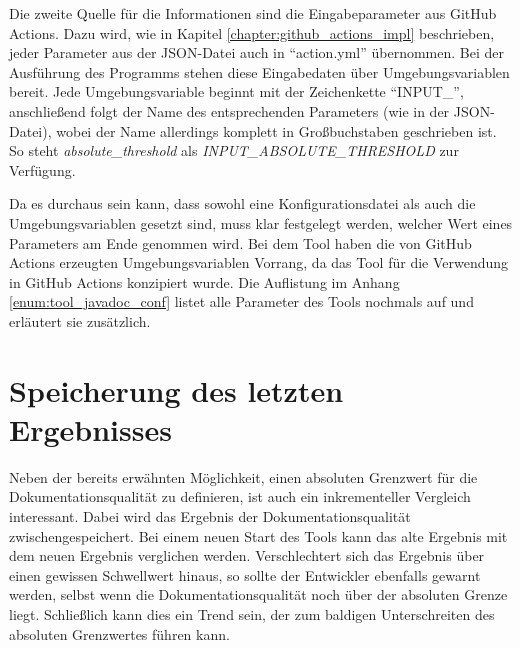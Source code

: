 \bigskip
Die zweite Quelle für die Informationen sind die Eingabeparameter aus GitHub Actions. Dazu wird, wie in Kapitel \ref{chapter:github_actions_impl} beschrieben, jeder Parameter aus der \ac{JSON}-Datei auch in \enquote{action.yml} übernommen. Bei der Ausführung des Programms stehen diese Eingabedaten über Umgebungsvariablen bereit. Jede Umgebungsvariable beginnt mit der Zeichenkette \enquote{INPUT\_}, anschließend folgt der Name des entsprechenden Parameters (wie in der \ac{JSON}-Datei), wobei der Name allerdings komplett in Großbuchstaben geschrieben ist. So steht  \textit{absolute\_threshold} als \textit{INPUT\_ABSOLUTE\_THRESHOLD} zur Verfügung.

Da es durchaus sein kann, dass sowohl eine Konfigurationsdatei als auch die Umgebungsvariablen gesetzt sind, muss klar festgelegt werden, welcher Wert eines Parameters am Ende genommen wird. Bei dem Tool haben die von GitHub Actions erzeugten Umgebungsvariablen  Vorrang, da das Tool für die Verwendung in GitHub Actions konzipiert wurde.  Die Auflistung im Anhang \ref{enum:tool_javadoc_conf} listet alle Parameter des Tools nochmals auf und erläutert sie zusätzlich. 

\begin{comment}
Das Tool \textit{create\_conf}, das im Hauptverzeichnis im GitHub-Repository liegt kann eine beispielhafte Konfigurationsdatei erstellen, indem \textit{node create\_conf.js --out PATH --type json} aufgerufen wird. Dabei ist \textit{PATH} ein Pfad ohne Dateiname. Dieses Hilfstool legt dann eine Konfigurationsdatei namens \enquote{comment\_conf.json} in dem angegebenen Verzeichnis an. 
\end{comment}
\section{Speicherung des letzten Ergebnisses}\label{chapter:saving}
Neben der bereits erwähnten Möglichkeit, einen absoluten Grenzwert für die Dokumentationsqualität zu definieren, ist auch ein inkrementeller Vergleich interessant. Dabei wird das Ergebnis der Dokumentationsqualität zwischengespeichert. Bei einem neuen Start des Tools kann das alte Ergebnis mit dem neuen Ergebnis verglichen werden. Verschlechtert sich das Ergebnis über einen gewissen Schwellwert hinaus, so sollte der Entwickler ebenfalls gewarnt werden, selbst wenn die Dokumentationsqualität noch über der absoluten Grenze liegt. Schließlich kann dies ein Trend sein, der zum baldigen Unterschreiten des absoluten Grenzwertes führen kann. 


